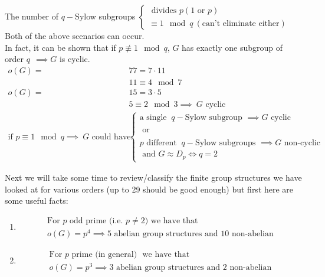 \begin{enumerate}[label=(\arabic*.)]
    The number of $q-$Sylow subgroups $\begin{cases}
    \text{ divides }p (1 \text{ or }p)\\
    \equiv 1\mod q \ (\text{can't eliminate either})
\end{cases}$\\
Both of the above scenarios can occur. \steezybreak\\
In fact, it can be shown that if $p\not \equiv 1 \mod q$, $G$ has exactly one subgroup of order $q\ \ \implies G$ is cyclic.
\begin{align}
    o(G)=&77=7\cdot 11 \nonumber \\
    &11\equiv 4 \mod 7 \nonumber \\
    o(G)=&15= 3\cdot 5 \nonumber \\
    &5\equiv 2 \mod 3 \implies \ G \text{ cyclic} \nonumber \\
    \text{if }p \equiv 1 \mod q \implies \ G \text{ could have: }&\begin{cases}
      \text{a single } \ q-\text{Sylow subgroup } \implies G \text{ cyclic }\\
      \\
      \text{ or } \\
      \\
      p \text{ different } \ q-\text{Sylow subgroups } \implies G \text{ non-cyclic}\\ 
      \text{ and } G\approx D_p \iff q=2
    \end{cases} \nonumber
\end{align}
\end{enumerate}
Next we will take some time to review/classify the finite group structures we have looked at for various orders (up to 29 should be good enough) but first here are some useful facts:
\begin{enumerate}
    \item \begin{align}
    \text{For }p \text{ odd prime (i.e. }p\neq 2) \text{ we have that } \nonumber \\
    o(G)=p^4 \implies 5 \text{ abelian group structures and } 10 \text{ non-abelian} \nonumber
\end{align}
\item \begin{align}
    \text{For }p \text{ prime (in general) } \text{ we have that } \nonumber \\
    o(G)=p^3 \implies 3 \text{ abelian group structures and } 2 \text{ non-abelian} \nonumber
\end{align}
\end{enumerate}

